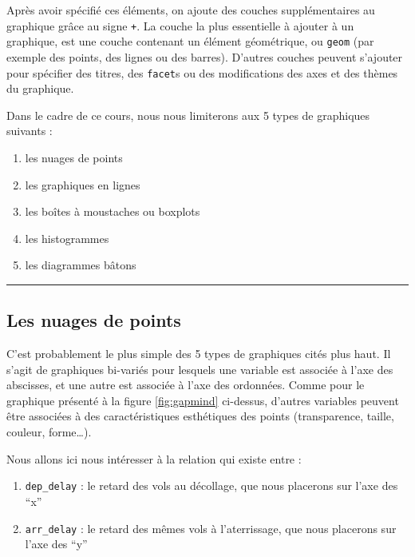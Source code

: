 \documentclass[a4paperpaper,]{article}
\providecommand{\tightlist}{%
  \setlength{\itemsep}{0pt}\setlength{\parskip}{0pt}}
\theoremstyle{definition}
\theoremstyle{definition}
\theoremstyle{definition}
\theoremstyle{remark}
\begin{document}
Après avoir spécifié ces éléments, on ajoute des couches supplémentaires
au graphique grâce au signe \texttt{+}. La couche la plus essentielle à
ajouter à un graphique, est une couche contenant un élément géométrique,
ou \texttt{geom} (par exemple des points, des lignes ou des barres).
D'autres couches peuvent s'ajouter pour spécifier des titres, des
\texttt{facet}s ou des modifications des axes et des thèmes du
graphique.

Dans le cadre de ce cours, nous nous limiterons aux 5 types de
graphiques suivants :

\begin{enumerate}
\def\labelenumi{\arabic{enumi}.}
\tightlist
\item
  les nuages de points
\item
  les graphiques en lignes
\item
  les boîtes à moustaches ou boxplots
\item
  les histogrammes
\item
  les diagrammes bâtons
\end{enumerate}

\begin{center}\rule{0.5\linewidth}{\linethickness}\end{center}

\subsection{Les nuages de points}\label{clouds}

C'est probablement le plus simple des 5 types de graphiques cités plus
haut. Il s'agit de graphiques bi-variés pour lesquels une variable est
associée à l'axe des abscisses, et une autre est associée à l'axe des
ordonnées. Comme pour le graphique présenté à la figure
\ref{fig:gapmind} ci-dessus, d'autres variables peuvent être associées à
des caractéristiques esthétiques des points (transparence, taille,
couleur, forme\ldots{}).

Nous allons ici nous intéresser à la relation qui existe entre :

\begin{enumerate}
\def\labelenumi{\arabic{enumi}.}
\tightlist
\item
  \texttt{dep\_delay} : le retard des vols au décollage, que nous
  placerons sur l'axe des ``x''
\item
  \texttt{arr\_delay} : le retard des mêmes vols à l'aterrissage, que
  nous placerons sur l'axe des ``y''
\end{enumerate}
\end{document}
